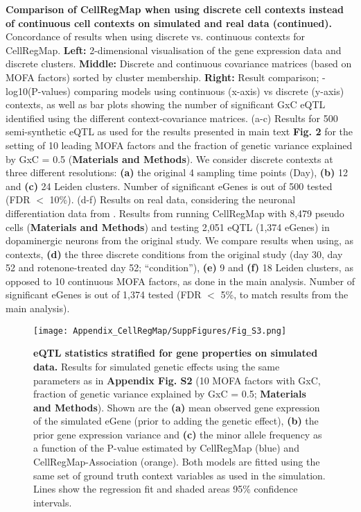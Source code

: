 \small{\textbf{Comparison of CellRegMap when using discrete cell contexts instead of continuous cell contexts on simulated and real data (continued).}
Concordance of results when using discrete vs. continuous contexts for CellRegMap. 
\textbf{Left:} 2-dimensional visualisation of the gene expression data and discrete clusters. 
\textbf{Middle:} Discrete and continuous covariance matrices (based on MOFA factors) sorted by cluster membership. 
\textbf{Right:} Result comparison; -log10(P-values) comparing models using continuous (x-axis) vs discrete (y-axis) contexts, as well as bar plots showing the number of significant GxC eQTL identified using the different context-covariance matrices.
(a-c) Results for 500 semi-synthetic eQTL as used for the results presented in main text \textbf{Fig. 2} for the setting of 10 leading MOFA factors and the fraction of genetic variance explained by GxC = 0.5 (\textbf{Materials and Methods}).
We consider discrete contexts at three different resolutions: \textbf{(a)} the original 4 sampling time points (Day), \textbf{(b)} 12 and \textbf{(c)} 24 Leiden clusters. 
Number of significant eGenes is out of 500 tested (FDR $<$ 10\%). 
(d-f) Results on real data, considering the neuronal differentiation data from \cite{jerber2021population}. 
Results from running CellRegMap with 8,479 pseudo cells (\textbf{Materials and Methods}) and testing 2,051 eQTL (1,374 eGenes) in dopaminergic neurons from the original study. 
We compare results when using, as contexts, \textbf{(d)} the three discrete conditions from the original study (day 30, day 52 and rotenone-treated day 52; “condition”), \textbf{(e)} 9 and \textbf{(f)} 18 Leiden clusters, as opposed to 10 continuous MOFA factors, as done in the main analysis. 
Number of significant eGenes is out of 1,374 tested (FDR $<$ 5\%, to match results from the main analysis).} 

\begin{figure}[h]
    \centering
    \texttt{[image: Appendix\_CellRegMap/SuppFigures/Fig\_S3.png]}
    \caption{\textbf{eQTL statistics stratified for gene properties on simulated data.}
    Results for simulated genetic effects using the same parameters as in \textbf{Appendix Fig. S2} (10 MOFA factors with GxC, fraction of genetic variance explained by GxC = 0.5; \textbf{Materials and Methods}). 
    Shown are the \textbf{(a)} mean observed gene expression of the simulated eGene (prior to adding the genetic effect), \textbf{(b)} the prior gene expression variance and \textbf{(c)} the minor allele frequency as a function of the P-value estimated by CellRegMap (blue) and CellRegMap-Association (orange). 
    Both models are fitted using the same set of ground truth context variables as used in the simulation. 
    Lines show the regression fit and shaded areas 95\% confidence intervals.
}
\end{figure}

